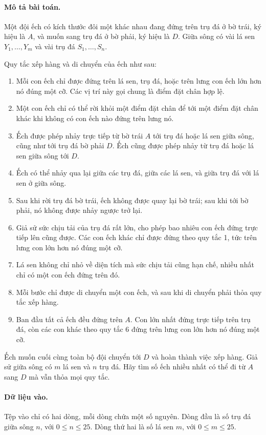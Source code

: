 \documentclass[11pt]{article}
\begin{document}
\paragraph{Mô tả bài toán.}
Một đội ếch có kích thước đôi một khác nhau đang đứng trên trụ đá ở bờ trái,
ký hiệu là \(A\), và muốn sang trụ đá ở bờ phải, ký hiệu là \(D\). Giữa sông
có vài lá sen \(Y_1,\ldots,Y_m\) và vài trụ đá \(S_1,\ldots,S_n\).

Quy tắc xếp hàng và di chuyển của ếch như sau:
\begin{enumerate}
  \item Mỗi con ếch chỉ được đứng trên lá sen, trụ đá, hoặc trên lưng con ếch
  lớn hơn nó đúng một cỡ. Các vị trí này gọi chung là điểm đặt chân hợp lệ.
  \item Một con ếch chỉ có thể rời khỏi một điểm đặt chân để tới một điểm đặt
  chân khác khi không có con ếch nào đứng trên lưng nó.
  \item Ếch được phép nhảy trực tiếp từ bờ trái \(A\) tới trụ đá hoặc lá sen
  giữa sông, cũng như tới trụ đá bờ phải \(D\). Ếch cũng được phép nhảy từ
  trụ đá hoặc lá sen giữa sông tới \(D\).
  \item Ếch có thể nhảy qua lại giữa các trụ đá, giữa các lá sen, và giữa trụ
  đá với lá sen ở giữa sông.
  \item Sau khi rời trụ đá bờ trái, ếch không được quay lại bờ trái; sau khi
  tới bờ phải, nó không được nhảy ngược trở lại.
  \item Giả sử sức chịu tải của trụ đá rất lớn, cho phép bao nhiêu con ếch
  đứng trực tiếp lên cũng được. Các con ếch khác chỉ được đứng theo quy tắc
  1, tức trên lưng con lớn hơn nó đúng một cỡ.
  \item Lá sen không chỉ nhỏ về diện tích mà sức chịu tải cũng hạn chế, nhiều
  nhất chỉ có một con ếch đứng trên đó.
  \item Mỗi bước chỉ được di chuyển một con ếch, và sau khi di chuyển phải
  thỏa quy tắc xếp hàng.
  \item Ban đầu tất cả ếch đều đứng trên \(A\). Con lớn nhất đứng trực tiếp
  trên trụ đá, còn các con khác theo quy tắc 6 đứng trên lưng con lớn hơn nó
  đúng một cỡ.
\end{enumerate}
Ếch muốn cuối cùng toàn bộ đội chuyển tới \(D\) và hoàn thành việc xếp hàng.
Giả sử giữa sông có \(m\) lá sen và \(n\) trụ đá. Hãy tìm số ếch nhiều nhất
có thể đi từ \(A\) sang \(D\) mà vẫn thỏa mọi quy tắc.

\paragraph{Dữ liệu vào.}
Tệp vào chỉ có hai dòng, mỗi dòng chứa một số nguyên. Dòng đầu là số trụ đá
giữa sông \(n\), với \(0\le n\le 25\). Dòng thứ hai là số lá sen \(m\), với
\(0\le m\le 25\).
\end{document}
